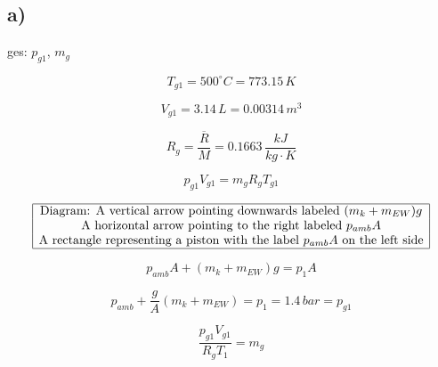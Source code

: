 

\subsection*{a)}
ges: $p_{g1}$, $m_g$

\[
T_{g1} = 500^\circ C = 773.15 \, K
\]

\[
V_{g1} = 3.14 \, L = 0.00314 \, m^3
\]

\[
R_g = \frac{\overline{R}}{M} = 0.1663 \, \frac{kJ}{kg \cdot K}
\]

\[
p_{g1} V_{g1} = m_g R_g T_{g1}
\]

\[
\begin{array}{|c|}
\hline
\text{Diagram: A vertical arrow pointing downwards labeled } (m_k + m_{EW})g \\
\text{A horizontal arrow pointing to the right labeled } p_{amb} A \\
\text{A rectangle representing a piston with the label } p_{amb} A \text{ on the left side} \\
\hline
\end{array}
\]

\[
p_{amb} A + (m_k + m_{EW})g = p_{1} A
\]

\[
p_{amb} + \frac{g}{A} (m_k + m_{EW}) = p_{1} = 1.4 \, bar = p_{g1}
\]

\[
\frac{p_{g1} V_{g1}}{R_g T_{1}} = m_g
\]